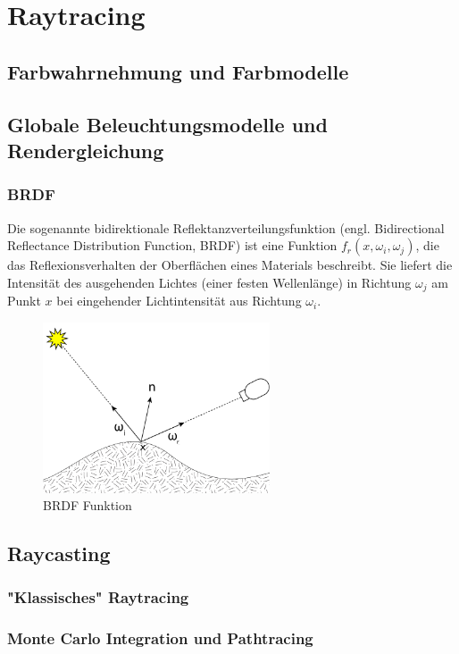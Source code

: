 \section{Raytracing}

\subsection{Farbwahrnehmung und Farbmodelle}
\subsection{Globale Beleuchtungsmodelle und Rendergleichung}
\subsubsection{BRDF}
Die sogenannte bidirektionale Reflektanzverteilungsfunktion (engl. Bidirectional Reflectance Distribution Function, BRDF)
ist eine Funktion $f_r (x, \omega_i, \omega_j)$, die das Reflexionsverhalten der Oberflächen eines Materials beschreibt.
Sie liefert die Intensität des ausgehenden Lichtes (einer festen Wellenlänge) in Richtung $\omega_j$ am Punkt $x$ bei eingehender Lichtintensität aus Richtung $\omega_i$.
 \begin{figure}[H]
    \centering
    \includegraphics[width=0.6\textwidth]{images/BRDF_Diagram.png}
    \caption{BRDF Funktion}
    \label{fig:raytracin_brdf}
\end{figure}
\subsection{Raycasting}
\subsubsection{"Klassisches" Raytracing}
\subsubsection{Monte Carlo Integration und Pathtracing}
